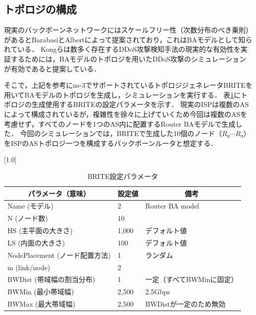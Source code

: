 \documentclass[Japanese]{dicomopapers}
\begin{document}
\subsection{トポロジの構成}
現実のバックボーンネットワークにはスケールフリー性（次数分布のべき乗則）があるとBarabasiとAlbertによって提案されており，これはBAモデルとして知られている\cite{ba-model}．
Kongらは数多く存在するDDoS攻撃検知手法の現実的な有効性を実証するためには，BAモデルのトポロジを用いたDDoS攻撃のシミュレーションが有効であると提案している\cite{random-flow-ddos}．

そこで，上記を参考にns-3でサポートされているトポロジジェネレータBRITE\cite{brite}を用いてBAモデルのトポロジを生成し，シミュレーションを実行する．
表\ref{tab:brite-param}にトポロジの生成使用するBRITEの設定パラメータを示す．
現実のISPは複数のASによって構成されている\cite{realistic-topologies}が，複雑性を徐々に上げていくため今回は複数のASを考慮せず，すべてのノードを1つのAS内に配置するRouter BAモデルで生成した．
今回のシミュレーションでは，BRITEで生成した10個のノード（$R_{0} \cdots R_{9}$）をISPのASトポロジ一つを構成するバックボーンルータと想定する．

\begin{table}[tb]
    \caption{BRITE設定パラメータ}
    \label{tab:brite-param}
    \begin{center}
        \scalebox{0.80}[1.0]{
            \begin{tabular}{lll}
                \hline
                \multicolumn{1}{c}{パラメータ（意味）} & \multicolumn{1}{c}{設定値} & \multicolumn{1}{c}{備考} \\ \hline
                Name (モデル)                    & 2                       & Router BA model        \\
                N (ノード数)                      & 10                      &                        \\
                HS (主平面の大きさ)                  & 1,000                   & デフォルト値                 \\
                LS (内面の大きさ)                   & 100                     & デフォルト値                 \\
                NodePlacement (ノード配置方法)       & 1                       & ランダム                   \\
                m (link/node)                 & 2                       &                        \\
                BWDist (帯域幅の割当分布)             & 1                       & 一定（すべてBWMinに固定）        \\
                BWMin (最小帯域幅)                 & 2,500                   & 2.5Gbps                \\
                BWMax (最大帯域幅)                 & 2,500                   & BWDistが一定のため無効         \\ \hline
            \end{tabular}
        }
    \end{center}
\end{table}
\end{document}
